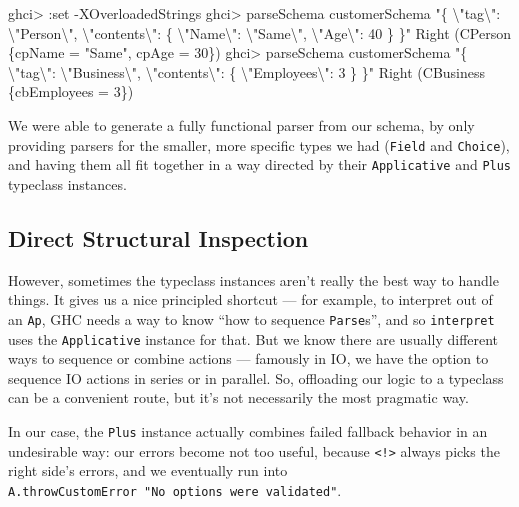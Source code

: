 \documentclass[]{article}
\newenvironment{Shaded}{}{}
\newcommand{\DataTypeTok}[1]{\textcolor[rgb]{0.56,0.13,0.00}{#1}}
\newcommand{\DecValTok}[1]{\textcolor[rgb]{0.25,0.63,0.44}{#1}}
\newcommand{\NormalTok}[1]{#1}
\newcommand{\OperatorTok}[1]{\textcolor[rgb]{0.40,0.40,0.40}{#1}}
\newcommand{\OtherTok}[1]{\textcolor[rgb]{0.00,0.44,0.13}{#1}}
\newcommand{\StringTok}[1]{\textcolor[rgb]{0.25,0.44,0.63}{#1}}
\begin{document}
\begin{Shaded}
\begin{Highlighting}[]
\NormalTok{ghci}\OperatorTok{>} \OperatorTok{:}\NormalTok{set }\OperatorTok{{-}}\DataTypeTok{XOverloadedStrings}
\NormalTok{ghci}\OperatorTok{>}\NormalTok{ parseSchema customerSchema  }\StringTok{"\{ \textbackslash{}"tag\textbackslash{}": \textbackslash{}"Person\textbackslash{}", \textbackslash{}"contents\textbackslash{}": \{ \textbackslash{}"Name\textbackslash{}": \textbackslash{}"Same\textbackslash{}", \textbackslash{}"Age\textbackslash{}": 40 \} \}"}
\DataTypeTok{Right}\NormalTok{ (}\DataTypeTok{CPerson}\NormalTok{ \{cpName }\OtherTok{=} \StringTok{"Same"}\NormalTok{, cpAge }\OtherTok{=} \DecValTok{30}\NormalTok{\})}
\NormalTok{ghci}\OperatorTok{>}\NormalTok{ parseSchema customerSchema  }\StringTok{"\{ \textbackslash{}"tag\textbackslash{}": \textbackslash{}"Business\textbackslash{}", \textbackslash{}"contents\textbackslash{}": \{ \textbackslash{}"Employees\textbackslash{}": 3 \} \}"}
\DataTypeTok{Right}\NormalTok{ (}\DataTypeTok{CBusiness}\NormalTok{ \{cbEmployees }\OtherTok{=} \DecValTok{3}\NormalTok{\})}
\end{Highlighting}
\end{Shaded}

We were able to generate a fully functional parser from our schema, by only
providing parsers for the smaller, more specific types we had (\texttt{Field}
and \texttt{Choice}), and having them all fit together in a way directed by
their \texttt{Applicative} and \texttt{Plus} typeclass instances.

\hypertarget{direct-structural-inspection}{%
\subsection{Direct Structural Inspection}\label{direct-structural-inspection}}

However, sometimes the typeclass instances aren't really the best way to handle
things. It gives us a nice principled shortcut --- for example, to interpret out
of an \texttt{Ap}, GHC needs a way to know ``how to sequence \texttt{Parse}s'',
and so \texttt{interpret} uses the \texttt{Applicative} instance for that. But
we know there are usually different ways to sequence or combine actions ---
famously in IO, we have the option to sequence IO actions in series or in
parallel. So, offloading our logic to a typeclass can be a convenient route, but
it's not necessarily the most pragmatic way.

In our case, the \texttt{Plus} instance actually combines failed fallback
behavior in an undesirable way: our errors become not too useful, because
\texttt{\textless{}!\textgreater{}} always picks the right side's errors, and we
eventually run into \texttt{A.throwCustomError\ "No\ options\ were\ validated"}.
\end{document}
